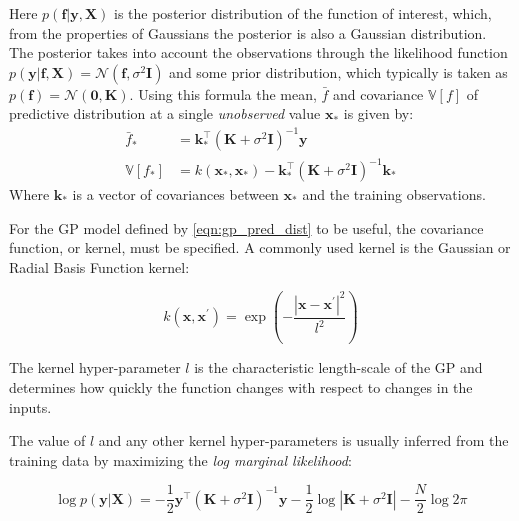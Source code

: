 Here $p(\mathbf{f}|\mathbf{y}, \mathbf{X})$ is the posterior distribution of the function of interest, which, from the properties of Gaussians the posterior is also a Gaussian distribution. The posterior takes into account the observations through the likelihood function $p(\mathbf{y}|\mathbf{f}, \mathbf{X}) = \mathcal{N}(\mathbf{f}, \sigma^{2}\mathbf{I})$ and some prior distribution, which typically is taken as $p(\mathbf{f}) = \mathcal{N}(\mathbf{0}, \mathbf{K})$.  Using this formula the mean, $\bar{f}$ and covariance $\mathbb{V}\left[f\right]$ of predictive distribution at a single  \emph{unobserved} value $\mathbf{x}_{*}$ is given by: 
\begin{equation}\label{eqn:gp_pred_dist}
\begin{aligned}
\bar{f}_{*} &=\mathbf{k}_{*}^{\top}\left(\mathbf{K}+\sigma^{2} \mathbf{I}\right)^{-1} \mathbf{y} \\
\mathbb{V}\left[f_{*}\right] &=k\left(\mathbf{x}_{*}, \mathbf{x}_{*}\right)-\mathbf{k}_{*}^{\top}\left(\mathbf{K}+\sigma^{2} \mathbf{I}\right)^{-1} \mathbf{k}_{*}
\end{aligned}
\end{equation}
Where $\mathbf{k}_{*}$ is a vector of covariances between $\mathbf{x}_{*}$ and the training observations. 

For the GP model defined by \ref{eqn:gp_pred_dist} to be useful, the covariance function, or kernel, must be specified. A commonly used kernel is the Gaussian or Radial Basis Function kernel: 

\begin{equation}
    k(\mathbf{x}, \mathbf{x}^{\prime}) = \exp{\left(-\frac{\left|\mathbf{x}-\mathbf{x}^{\prime}\right|^{2}}{l^{2}}\right)}
\end{equation}

The kernel hyper-parameter $l$ is the characteristic length-scale of the GP and determines how quickly the function changes with respect to changes in the inputs. 

The value of $l$ and any other kernel hyper-parameters is usually inferred from the training data by maximizing the \emph{log marginal likelihood}:

\begin{equation}\label{eqn:marg_llike}
\log p(\mathbf{y} | \mathbf{X})=-\frac{1}{2} \mathbf{y}^{\top}\left(\mathbf{K}+\sigma^{2} \mathbf{I}\right)^{-1} \mathbf{y}-\frac{1}{2} \log \left|\mathbf{K}+\sigma^{2} \mathbf{I}\right|-\frac{N}{2} \log 2 \pi
\end{equation}

